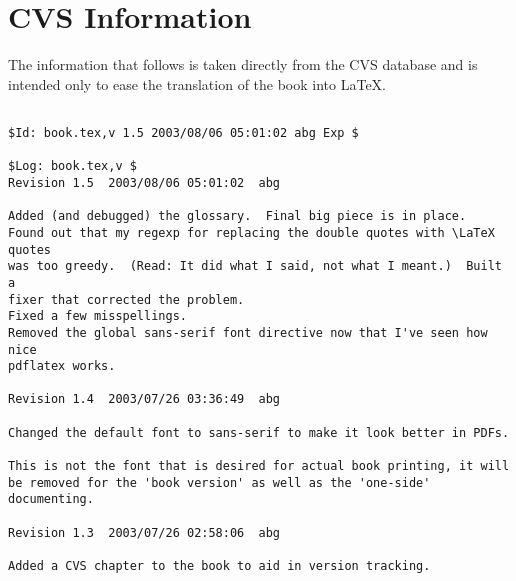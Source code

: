 \documentclass[oneside]{scrbook}
\begin{document}
\chapter{CVS Information}
The information that follows is taken directly from the CVS database and 
is intended only to ease the translation of the book into \LaTeX.
\begin{verbatim}

$Id: book.tex,v 1.5 2003/08/06 05:01:02 abg Exp $

$Log: book.tex,v $
Revision 1.5  2003/08/06 05:01:02  abg

Added (and debugged) the glossary.  Final big piece is in place.
Found out that my regexp for replacing the double quotes with \LaTeX quotes
was too greedy.  (Read: It did what I said, not what I meant.)  Built a
fixer that corrected the problem.
Fixed a few misspellings.
Removed the global sans-serif font directive now that I've seen how nice
pdflatex works.

Revision 1.4  2003/07/26 03:36:49  abg

Changed the default font to sans-serif to make it look better in PDFs.

This is not the font that is desired for actual book printing, it will
be removed for the 'book version' as well as the 'one-side' documenting.

Revision 1.3  2003/07/26 02:58:06  abg

Added a CVS chapter to the book to aid in version tracking.


\end{verbatim}
\end{document}
